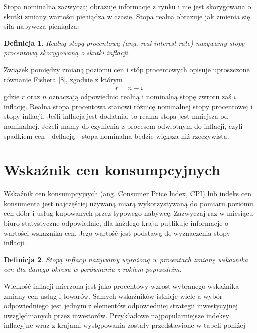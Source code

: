 \documentclass{mini}
\theoremstyle{mythstyle}
\newtheorem{Definicja}{Definicja}[chapter]
\begin{document}
	Stopa nominalna zazwyczaj obrazuje informacje z rynku i nie jest skorygowana o skutki zmiany wartości pieniądza w czasie. Stopa realna obrazuje jak zmienia się siła nabywcza pieniądza.\\
	
	\begin{Definicja}
		Realną stopą procentową (ang. real interest rate) nazywamy stopę procentową skorygowaną o skutki inflacji.
	\end{Definicja}

	Związek pomiędzy zmianą poziomu cen i stóp procentowych opisuje uproszczone równanie Fishera [8], zgodnie z którym
	\begin{eqnarray}
		r = n - i
	 \end{eqnarray}
	gdzie $r$ oraz $n$ oznaczają odpowiednio realną i nominalną stopę zwrotu zaś $i$ inflację. Realna stopa procentowa stanowi różnicę nominalnej stopy procentowej i stopy inflacji. Jeśli inflacja jest dodatnia, to realna stopa jest mniejsza od nominalnej. Jeżeli mamy do czynienia z procesem odwrotnym do inflacji, czyli spadkiem cen - deflacją - stopa nominalna będzie większa niż rzeczywista. 
	
	\section{Wskaźnik cen konsumpcyjnych}
		
	 Wskaźnik cen konsumpcyjnych (ang. Consumer Price Index, CPI) lub indeks cen konsumenta jest najczęściej używaną miarą wykorzystywaną do pomiaru poziomu cen dóbr i usług kupowanych przez typowego nabywcę. Zazwyczaj raz w miesiącu biuro statystyczne odpowiednie, dla każdego kraju publikuje informacje o wartości wskaznika cen. Jego wartość jest podstawą do wyznaczenia stopy inflacji.\\
	 
	 \begin{Definicja}
	 	Stopą inflacji nazywamy wyrażoną w procentach zmianę wskaznika cen dla danego okresu w porównaniu z rokiem poprzednim.
	 \end{Definicja} 
	 	 
	 Wielkość inflacji mierzona jest jako procentowy wzrost wybranego wskaźnika zmiany cen usług i towarów. Samych wskaźników istnieje wiele a wybór odpowiedniego jest jednym z elementów odpowiedniej strategii inwestycyjnej uwzględnianych przez inwestorów. Przykładowe najpopularniejsze indeksy inflacyjne wraz z krajami występowania zostały przedstawione w tabeli poniżej
	
\end{document}
